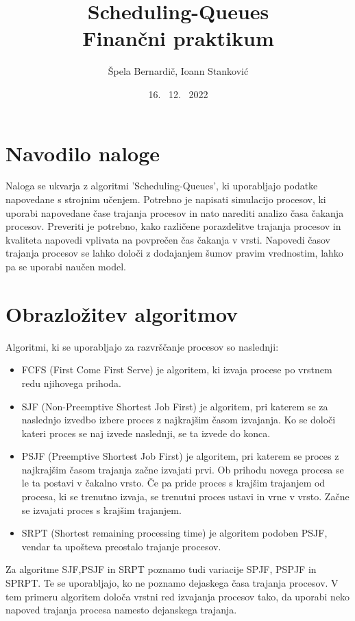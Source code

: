 \documentclass[a4paper, pt14]{article}
\begin{document}
\title{%
Scheduling-Queues\\
  \large Finančni praktikum}
\author{Špela Bernardič, Ioann Stanković}
\date{16. \ 12. \ 2022}

\maketitle

\section{Navodilo naloge}
Naloga se ukvarja z algoritmi 'Scheduling-Queues', ki uporabljajo podatke napovedane s strojnim učenjem.
Potrebno je napisati simulacijo procesov, ki uporabi napovedane čase trajanja procesov in nato narediti analizo časa čakanja procesov.
Preveriti je potrebno, kako različene porazdelitve trajanja procesov in kvaliteta napovedi vplivata na povprečen čas čakanja v vrsti.
Napovedi časov trajanja procesov se lahko določi z dodajanjem šumov pravim vrednostim, lahko pa se uporabi naučen model.


\section{Obrazložitev algoritmov}
Algoritmi, ki se uporabljajo za razvrščanje procesov so naslednji:
\begin{itemize}
  \item FCFS (First Come First Serve) je algoritem, ki izvaja procese po vrstnem redu njihovega prihoda.
  \item SJF (Non-Preemptive Shortest Job First) je algoritem, pri katerem se za naslednjo izvedbo izbere proces z najkrajšim časom izvajanja. Ko se določi kateri proces se naj izvede naslednji, se ta izvede do konca. 
  \item PSJF (Preemptive Shortest Job First) je algoritem, pri katerem se proces z najkrajšim časom trajanja začne izvajati prvi. Ob prihodu novega procesa se le ta postavi v čakalno vrsto. Če pa pride proces s krajšim trajanjem od procesa, ki se trenutno izvaja, se trenutni proces ustavi in vrne v vrsto. Začne se izvajati proces s krajšim trajanjem.
  \item SRPT (Shortest remaining processing time) je algoritem podoben PSJF, vendar ta upošteva preostalo trajanje procesov.
\end{itemize}
Za algoritme SJF,PSJF in SRPT poznamo tudi variacije SPJF, PSPJF in SPRPT. Te se uporabljajo, ko ne poznamo dejaskega časa trajanja procesov. V tem primeru algoritem določa vrstni red izvajanja procesov tako, da uporabi neko napoved trajanja procesa namesto dejanskega trajanja.
\end{document}
